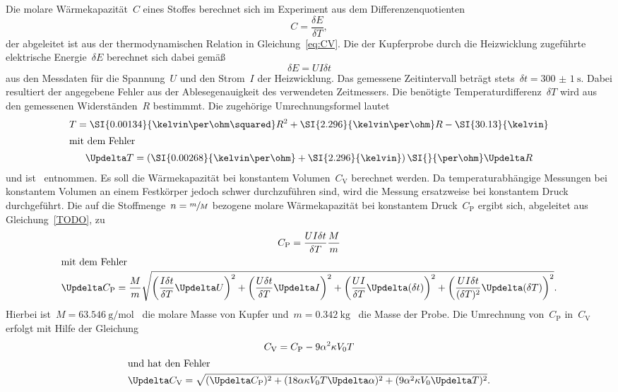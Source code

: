 Die molare Wärmekapazität~$C$ eines Stoffes berechnet sich im Experiment aus
dem Differenzenquotienten
%
\begin{equation}
  C=\frac{\delta E}{\delta T},
\end{equation}
%
der abgeleitet ist aus der thermodynamischen Relation in
Gleichung~\eqref{eq:CV}. Die der Kupferprobe durch die Heizwicklung zugeführte
elektrische Energie~$\delta E$ berechnet sich dabei gemäß
%
\begin{equation}
  \delta E = UI\delta t
\end{equation}
%
aus den Messdaten für die Spannung~$U$ und den Strom~$I$ der Heizwicklung. Das
gemessene Zeitintervall beträgt stets~$\delta t=\SI{300(1)}{\second}$. Dabei
resultiert der angegebene Fehler aus der Ablesegenauigkeit des verwendeten
Zeitmessers. Die benötigte Temperaturdifferenz~$\delta T$ wird aus den
gemessenen Widerständen~$R$ bestimmmt. Die zugehörige Umrechnungsformel lautet
%
\begin{gather}
  T=\SI{0.00134}{\kelvin\per\ohm\squared}R^2+\SI{2.296}{\kelvin\per\ohm}R-\SI{30.13}{\kelvin} \\
  \shortintertext{mit dem Fehler}
  \Updelta T=\left(\SI{0.00268}{\kelvin\per\ohm}+\SI{2.296}{\kelvin}\right)\SI{}{\per\ohm}\Updelta R
\end{gather}
%
und ist~\cite{V47} entnommen. Es soll die Wärmekapazität bei konstantem
Volumen~$C_{\mathrm{V}}$ berechnet werden. Da temperaturabhängige Messungen bei
konstantem Volumen an einem Festkörper jedoch schwer durchzuführen sind, wird
die Messung ersatzweise bei konstantem Druck durchgeführt.
Die auf die Stoffmenge~$n=\sfrac{m}{M}$ bezogene molare Wärmekapazität bei
konstantem Druck~$C_{\mathrm{P}}$ ergibt sich, abgeleitet aus
Gleichung~\eqref{TODO}, zu
%
\begin{gather}
  C_{\mathrm{P}}=\frac{UI\delta t}{\delta T}\frac{M}{m} \\
  \intertext{mit dem Fehler}
  \Updelta C_{\mathrm{P}}=\frac{M}{m}\sqrt{\left(\frac{I\delta t}{\delta T}\Updelta U\right)^2+\left(\frac{U\delta t}{\delta T}\Updelta I\right)^2+\left(\frac{UI}{\delta T}\Updelta(\delta t)\right)^2+\left(\frac{UI\delta t}{(\delta T)^2}\Updelta(\delta T)\right)^2}.
\end{gather}
%
Hierbei ist~$M=\SI{63.546}{\gram\per\mol}$~\cite{mathematica} die molare Masse
von Kupfer und~$m=\SI{0.342}{\kilo\gram}$~\cite{V47} die Masse der Probe. Die
Umrechnung von~$C_{\mathrm{P}}$ in~$C_{\mathrm{V}}$ erfolgt mit Hilfe der
Gleichung
%
\begin{gather}
  C_{\mathrm{V}}=C_{\mathrm{P}}-9\alpha^2\kappa V_0T\label{eq:Cp2Cv} \\
  \intertext{und hat den Fehler}
  \Updelta C_{\mathrm{V}}=\sqrt{(\Updelta C_{\mathrm{P}})^2+(18\alpha\kappa V_0T\Updelta\alpha)^2+(9\alpha^2\kappa V_0\Updelta T)^2}.
\end{gather}
